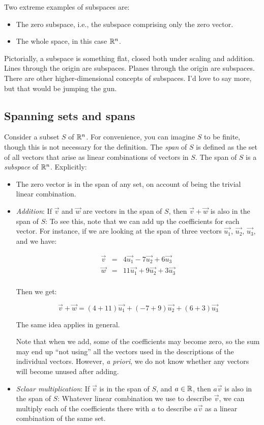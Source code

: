 \documentclass[10pt]{amsart}
\begin{document}
Two extreme examples of subspaces are:

\begin{itemize}
\item The zero subspace, i.e., the subspace comprising only the zero vector.
\item The whole space, in this case $\mathbb{R}^n$.
\end{itemize}

Pictorially, a subspace is something flat, closed both under scaling
and addition. Lines through the origin are subspaces. Planes through
the origin are subspaces. There are other higher-dimensional concepts
of subspaces. I'd love to say more, but that would be jumping the gun.

\subsection{Spanning sets and spans}

Consider a subset $S$ of $\mathbb{R}^n$. For convenience, you can imagine $S$
to be finite, though this is not necessary for the definition. The
{\em span} of $S$ is defined as the set of all vectors that arise as
linear combinations of vectors in $S$. The span of $S$ is a {\em
  subspace} of $\mathbb{R}^n$. Explicitly:

\begin{itemize}
\item The zero vector is in the span of any set, on account of being
  the trivial linear combination.
\item {\em Addition}: If $\vec{v}$ and $\vec{w}$ are vectors in the
  span of $S$, then $\vec{v} + \vec{w}$ is also in the span of $S$: To
  see this, note that we can add up the coefficients for each
  vector. For instance, if we are looking at the span of three vectors
  $\vec{u_1}$, $\vec{u_2}$, $\vec{u_3}$, and we have:

  \begin{eqnarray*}
    \vec{v} & = & 4\vec{u_1} - 7\vec{u_2} + 6\vec{u_3}\\
    \vec{w} & = & 11\vec{u_1} + 9\vec{u_2} + 3\vec{u_3}\\
  \end{eqnarray*}
  
  Then we get:

  $$\vec{v} + \vec{w} = (4 + 11)\vec{u_1} + (-7 + 9)\vec{u_2} + (6 + 3)\vec{u_3}$$

  The same idea applies in general.

  Note that when we add, some of the coefficients may become zero, so
  the sum may end up ``not using'' all the vectors used in the
  descriptions of the individual vectors. However, {\em a priori}, we
  do not know whether any vectors will become unused after adding.
\item {\em Sclaar multiplication}: If $\vec{v}$ is in the span of $S$,
  and $a \in \mathbb{R}$, then $a\vec{v}$ is also in the span of $S$: Whatever
  linear combination we use to describe $\vec{v}$, we can multiply
  each of the coefficients there with $a$ to describe $a\vec{v}$ as a
  linear combination of the same set.
\end{itemize}
\end{document}
